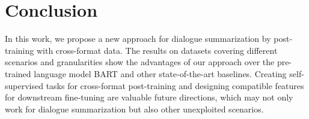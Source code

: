 \section{Conclusion}
\label{sec:conclusion}

In this work, we propose a new approach for dialogue summarization by post-training with cross-format data. The results on datasets covering different scenarios and granularities show the advantages of our approach over the pre-trained language model BART and other state-of-the-art baselines. Creating self-supervised tasks for cross-format post-training and designing compatible features for downstream fine-tuning are valuable future directions, which may not only work for dialogue summarization but also other unexploited scenarios.